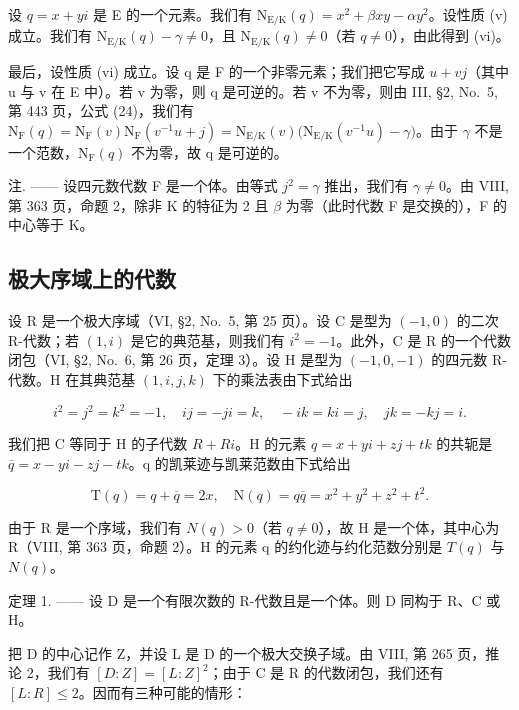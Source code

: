 设 \(q = x + yi\) 是 E 的一个元素。我们有 \(\mathrm{N}_{\mathrm{E / K}}(q) = x^2 + \beta xy - \alpha y^2\)。设性质 (v) 成立。我们有 \(\mathrm{N}_{\mathrm{E / K}}(q) - \gamma \neq 0\)，且 \(\mathrm{N}_{\mathrm{E / K}}(q) \neq 0\)（若 \(q \neq 0\)），由此得到 (vi)。

最后，设性质 (vi) 成立。设 q 是 F 的一个非零元素；我们把它写成 \(u + vj\)（其中 u 与 v 在 E 中）。若 v 为零，则 q 是可逆的。若 v 不为零，则由 III, §2, No.~5, 第 443 页，公式 (24)，我们有 \(\mathrm{N}_{\mathrm{F}}(q) = \mathrm{N}_{\mathrm{F}}(v)\mathrm{N}_{\mathrm{F}}(v^{-1}u + j) = \mathrm{N}_{\mathrm{E}/\mathrm{K}}(v)\big(\mathrm{N}_{\mathrm{E}/\mathrm{K}}(v^{-1}u) - \gamma\big)\)。由于 \(\gamma\) 不是一个范数，\(\mathrm{N}_{\mathrm{F}}(q)\) 不为零，故 q 是可逆的。

注. —— 设四元数代数 F 是一个体。由等式 \(j^{2} = \gamma\) 推出，我们有 \(\gamma \neq 0\)。由 VIII, 第 363 页，命题 2，除非 K 的特征为 2 且 \(\beta\) 为零（此时代数 F 是交换的），F 的中心等于 K。

\subsection{极大序域上的代数}

设 R 是一个极大序域（VI, §2, No.~5, 第 25 页）。设 C 是型为 \((-1,0)\) 的二次 R-代数；若 \((1,i)\) 是它的典范基，则我们有 \(i^{2}=-1\)。此外，C 是 R 的一个代数闭包（VI, §2, No.~6, 第 26 页，定理 3）。设 H 是型为 \((-1,0,-1)\) 的四元数 R-代数。H 在其典范基 \((1,i,j,k)\) 下的乘法表由下式给出

\[
i ^ {2} = j ^ {2} = k ^ {2} = - 1, \quad i j = - j i = k, \quad - i k = k i = j, \quad j k = - k j = i.
\]

我们把 C 等同于 H 的子代数 \(R + Ri\)。H 的元素 \(q = x + yi + zj + tk\) 的共轭是 \(\overline{q} = x - yi - zj - tk\)。q 的凯莱迹与凯莱范数由下式给出

\[
\mathrm{T} (q) = q + \overline {{q}} = 2 x, \quad \mathrm{N} (q) = q \overline {{q}} = x ^ {2} + y ^ {2} + z ^ {2} + t ^ {2}.
\]

由于 R 是一个序域，我们有 \(N(q) > 0\)（若 \(q \neq 0\)），故 H 是一个体，其中心为 R（VIII, 第 363 页，命题 2）。H 的元素 q 的约化迹与约化范数分别是 \(T(q)\) 与 \(N(q)\)。

定理 1. —— 设 D 是一个有限次数的 R-代数且是一个体。则 D 同构于 R、C 或 H。

把 D 的中心记作 Z，并设 L 是 D 的一个极大交换子域。由 VIII, 第 265 页，推论 2，我们有 \([D:Z]=[L:Z]^{2}\)；由于 C 是 R 的代数闭包，我们还有 \([L:R]\leqslant2\)。因而有三种可能的情形：

